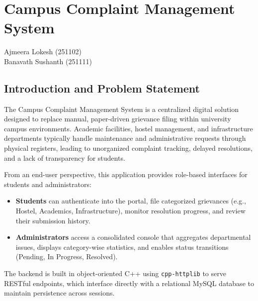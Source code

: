 \documentclass[12pt,a4paper,oneside]{book}
\makeatletter
\newcommand{\chapterauthor}[1]{%
  {\parindent0pt\vspace*{-15pt}%
  \linespread{1.1}\large\itshape\begin{flushright}#1\end{flushright}%
  \par\nobreak\vspace*{25pt}}
  \@afterheading%
}
\makeatother
\begin{document}
\mainmatter


\chapter{Campus Complaint Management System}
\chapterauthor{Ajmeera Lokesh (251102) \\ Banavath Sushanth (251111)}

\section{Introduction and Problem Statement}
The Campus Complaint Management System is a centralized digital solution designed to replace manual, paper-driven grievance filing within university campus environments. Academic facilities, hostel management, and infrastructure departments typically handle maintenance and administrative requests through physical registers, leading to unorganized complaint tracking, delayed resolutions, and a lack of transparency for students.

From an end-user perspective, this application provides role-based interfaces for students and administrators:
\begin{itemize}
    \item \textbf{Students} can authenticate into the portal, file categorized grievances (e.g., Hostel, Academics, Infrastructure), monitor resolution progress, and review their submission history.
    \item \textbf{Administrators} access a consolidated console that aggregates departmental issues, displays category-wise statistics, and enables status transitions (Pending, In Progress, Resolved).
\end{itemize}

The backend is built in object-oriented C++ using \texttt{cpp-httplib} to serve RESTful endpoints, which interface directly with a relational MySQL database to maintain persistence across sessions.
\end{document}
